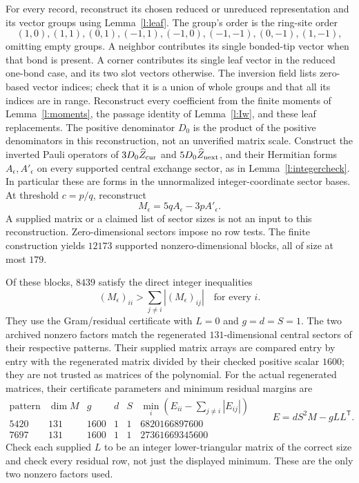 For every record, reconstruct its chosen reduced or unreduced
representation and its vector groups using Lemma~\ref{l:leaf}.
The group's order is the ring-site order
\[
 (1,0),(1,1),(0,1),(-1,1),(-1,0),(-1,-1),(0,-1),(1,-1),
\]
omitting empty groups. A neighbor contributes its single bonded-tip
vector when that bond is present. A corner contributes its single
leaf vector in the reduced one-bond case, and its two slot vectors
otherwise. The inversion field lists zero-based vector indices;
check that it is a union of whole groups and that all its indices
are in range. Reconstruct every coefficient from the finite moments
of Lemma~\ref{l:moments}, the passage identity of
Lemma~\ref{l:Iw}, and these leaf replacements. The positive
denominator \(D_0\) is the product of the positive denominators in
this reconstruction, not an unverified matrix scale.
Construct the inverted Pauli operators of
\(3D_0\widehat Z_{\rm cur}\) and
\(5D_0\widehat Z_{\rm next}\), and their Hermitian forms
\(A_\epsilon,A'_\epsilon\) on every supported central exchange
sector, as in Lemma~\ref{l:integercheck}. In particular these are
forms in the unnormalized integer-coordinate sector bases.
At threshold \(c=p/q\), reconstruct
\[
 M_\epsilon=5qA_\epsilon-3pA'_\epsilon .
\]
A supplied matrix or a claimed list of sector sizes is not an
input to this reconstruction. Zero-dimensional sectors impose no
row tests. The finite construction yields \(12173\) supported
nonzero-dimensional blocks, all of size at most \(179\).

Of these blocks, \(8439\) satisfy the direct integer inequalities
\[
 (M_\epsilon)_{ii}>
       \sum_{j\ne i}|(M_\epsilon)_{ij}|\quad\text{for every }i.
\]
They use the Gram/residual certificate with \(L=0\) and
\(g=d=S=1\). The two archived nonzero factors match the regenerated
\(131\)-dimensional central sectors of their respective patterns.
Their supplied matrix arrays are compared entry by entry with the
regenerated matrix divided by their checked positive scalar
\(1600\); they are not trusted as matrices of the polynomial.
For the actual regenerated matrices, their certificate parameters
and minimum residual margins are
\[
 \begin{array}{c|r|rrr|r}
 \text{pattern}&\dim M&g&d&S&
       \min_i(E_{ii}-\sum_{j\ne i}|E_{ij}|)\\ \hline
 5420&131&1600&1&1&6820166897600\\
 7697&131&1600&1&1&27361669345600
 \end{array}
 \qquad E=dS^2M-gLL^{\mathsf T}.
\]
Check each supplied \(L\) to be an integer lower-triangular matrix
of the correct size and check every residual row, not just the
displayed minimum. These are the only two nonzero factors used.

